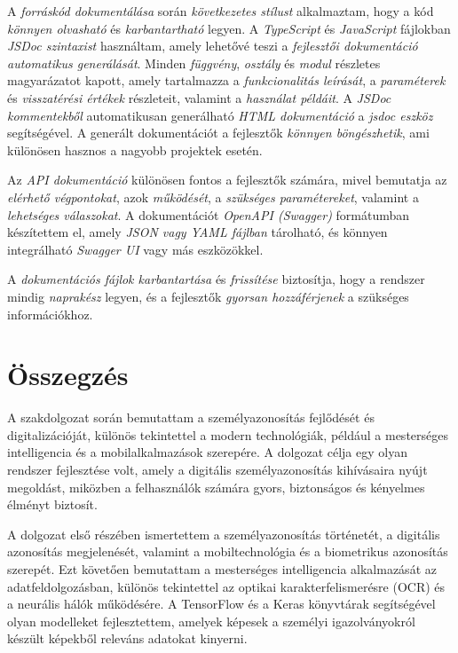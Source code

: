 \documentclass[
]{thesis-ekf}
\theoremstyle{definition}
\theoremstyle{remark}
\begin{document}
A \emph{forráskód dokumentálása} során \emph{következetes stílust} alkalmaztam, hogy a kód \emph{könnyen olvasható} és \emph{karbantartható} legyen. A \emph{TypeScript} és \emph{JavaScript} fájlokban \emph{JSDoc szintaxist} használtam, amely lehetővé teszi a \emph{fejlesztői dokumentáció automatikus generálását}. Minden \emph{függvény}, \emph{osztály} és \emph{modul} részletes magyarázatot kapott, amely tartalmazza a \emph{funkcionalitás leírását}, a \emph{paraméterek} és \emph{visszatérési értékek} részleteit, valamint a \emph{használat példáit}. A \emph{JSDoc kommentekből} automatikusan generálható \emph{HTML dokumentáció} a \emph{jsdoc eszköz} segítségével. A generált dokumentációt a fejlesztők \emph{könnyen böngészhetik}, ami különösen hasznos a nagyobb projektek esetén.

Az \emph{API dokumentáció} különösen fontos a fejlesztők számára, mivel bemutatja az \emph{elérhető végpontokat}, azok \emph{működését}, a \emph{szükséges paramétereket}, valamint a \emph{lehetséges válaszokat}. A dokumentációt \emph{OpenAPI (Swagger)} formátumban készítettem el, amely \emph{JSON vagy YAML fájlban} tárolható, és könnyen integrálható \emph{Swagger UI} vagy más eszközökkel.

A \emph{dokumentációs fájlok karbantartása} és \emph{frissítése} biztosítja, hogy a rendszer mindig \emph{naprakész} legyen, és a fejlesztők \emph{gyorsan hozzáférjenek} a szükséges információkhoz.

\chapter*{Összegzés}

A szakdolgozat során bemutattam a személyazonosítás fejlődését és digitalizációját, különös tekintettel a modern technológiák, például a mesterséges intelligencia és a mobilalkalmazások szerepére. A dolgozat célja egy olyan rendszer fejlesztése volt, amely a digitális személyazonosítás kihívásaira nyújt megoldást, miközben a felhasználók számára gyors, biztonságos és kényelmes élményt biztosít.

A dolgozat első részében ismertettem a személyazonosítás történetét, a digitális azonosítás megjelenését, valamint a mobiltechnológia és a biometrikus azonosítás szerepét. Ezt követően bemutattam a mesterséges intelligencia alkalmazását az adatfeldolgozásban, különös tekintettel az optikai karakterfelismerésre (OCR) és a neurális hálók működésére. A TensorFlow és a Keras könyvtárak segítségével olyan modelleket fejlesztettem, amelyek képesek a személyi igazolványokról készült képekből releváns adatokat kinyerni.
\end{document}
